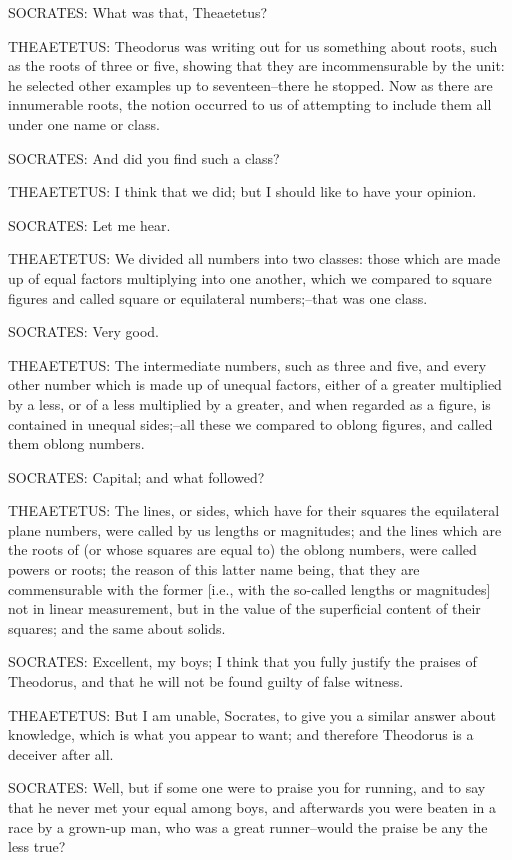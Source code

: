 SOCRATES: What was that, Theaetetus?

THEAETETUS: Theodorus was writing out for us something about roots, such
as the roots of three or five, showing that they are incommensurable by
the unit: he selected other examples up to seventeen--there he stopped.
Now as there are innumerable roots, the notion occurred to us of
attempting to include them all under one name or class.

SOCRATES: And did you find such a class?

THEAETETUS: I think that we did; but I should like to have your opinion.

SOCRATES: Let me hear.

THEAETETUS: We divided all numbers into two classes: those which are
made up of equal factors multiplying into one another, which we compared
to square figures and called square or equilateral numbers;--that was
one class.

SOCRATES: Very good.

THEAETETUS: The intermediate numbers, such as three and five, and every
other number which is made up of unequal factors, either of a greater
multiplied by a less, or of a less multiplied by a greater, and when
regarded as a figure, is contained in unequal sides;--all these we
compared to oblong figures, and called them oblong numbers.

SOCRATES: Capital; and what followed?

THEAETETUS: The lines, or sides, which have for their squares the
equilateral plane numbers, were called by us lengths or magnitudes; and
the lines which are the roots of (or whose squares are equal to) the
oblong numbers, were called powers or roots; the reason of this latter
name being, that they are commensurable with the former [i.e., with the
so-called lengths or magnitudes] not in linear measurement, but in the
value of the superficial content of their squares; and the same about
solids.

SOCRATES: Excellent, my boys; I think that you fully justify the praises
of Theodorus, and that he will not be found guilty of false witness.

THEAETETUS: But I am unable, Socrates, to give you a similar answer
about knowledge, which is what you appear to want; and therefore
Theodorus is a deceiver after all.

SOCRATES: Well, but if some one were to praise you for running, and to
say that he never met your equal among boys, and afterwards you were
beaten in a race by a grown-up man, who was a great runner--would the
praise be any the less true?

